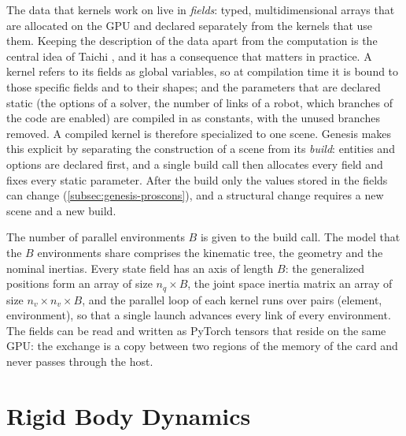 The data that kernels work on live in \emph{fields}: typed, multidimensional arrays that are allocated on the GPU and declared separately from the kernels that use them. Keeping the description of the data apart from the computation is the central idea of Taichi \cite{hu2019taichi}, and it has a consequence that matters in practice. A kernel refers to its fields as global variables, so at compilation time it is bound to those specific fields and to their shapes; and the parameters that are declared static (the options of a solver, the number of links of a robot, which branches of the code are enabled) are compiled in as constants, with the unused branches removed. A compiled kernel is therefore specialized to one scene. Genesis makes this explicit by separating the construction of a scene from its \emph{build}: entities and options are declared first, and a single build call then allocates every field and fixes every static parameter. After the build only the values stored in the fields can change (\autoref{subsec:genesis-proscons}), and a structural change requires a new scene and a new build.

The number of parallel environments $B$ is given to the build call. The model that the $B$ environments share comprises the kinematic tree, the geometry and the nominal inertias. Every state field has an axis of length $B$: the generalized positions form an array of size $n_q \times B$, the joint space inertia matrix an array of size $n_v \times n_v \times B$, and the parallel loop of each kernel runs over pairs (element, environment), so that a single launch advances every link of every environment. The fields can be read and written as PyTorch tensors that reside on the same GPU: the exchange is a copy between two regions of the memory of the card and never passes through the host.

\section{Rigid Body Dynamics}
\label{app:rigid-body}

